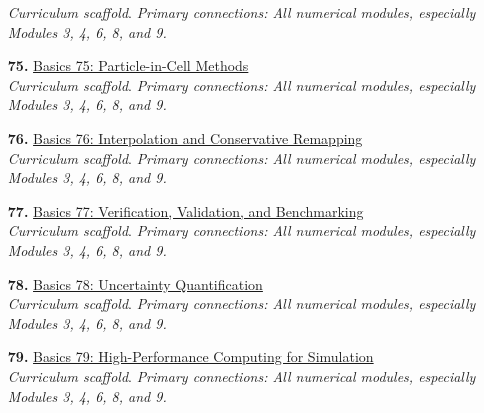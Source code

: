 \documentclass[11pt]{article}
\begin{document}
\begin{enumerate}[leftmargin=2.4em]
\textit{Curriculum scaffold}. \textit{Primary connections: All numerical modules, especially Modules 3, 4, 6, 8, and 9.}
\item[\textbf{75.}] \href{run:basics_75_particle_in_cell_methods.pdf}{Basics 75: Particle-in-Cell Methods}\\[-0.2em]
\textit{Curriculum scaffold}. \textit{Primary connections: All numerical modules, especially Modules 3, 4, 6, 8, and 9.}
\item[\textbf{76.}] \href{run:basics_76_interpolation_and_conservative_remapping.pdf}{Basics 76: Interpolation and Conservative Remapping}\\[-0.2em]
\textit{Curriculum scaffold}. \textit{Primary connections: All numerical modules, especially Modules 3, 4, 6, 8, and 9.}
\item[\textbf{77.}] \href{run:basics_77_verification_validation_and_benchmarking.pdf}{Basics 77: Verification, Validation, and Benchmarking}\\[-0.2em]
\textit{Curriculum scaffold}. \textit{Primary connections: All numerical modules, especially Modules 3, 4, 6, 8, and 9.}
\item[\textbf{78.}] \href{run:basics_78_uncertainty_quantification.pdf}{Basics 78: Uncertainty Quantification}\\[-0.2em]
\textit{Curriculum scaffold}. \textit{Primary connections: All numerical modules, especially Modules 3, 4, 6, 8, and 9.}
\item[\textbf{79.}] \href{run:basics_79_high_performance_computing_for_simulation.pdf}{Basics 79: High-Performance Computing for Simulation}\\[-0.2em]
\textit{Curriculum scaffold}. \textit{Primary connections: All numerical modules, especially Modules 3, 4, 6, 8, and 9.}
\end{enumerate}
\end{document}
